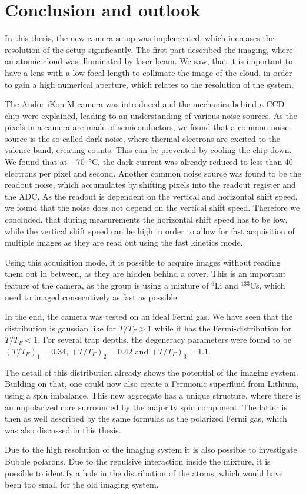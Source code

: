 \chapter{Conclusion and outlook}

In this thesis, the new camera setup was implemented, which increases the resolution of the setup significantly. The first part described the imaging, where an atomic cloud was illuminated by laser beam. We saw, that it is important to have a lens with a low focal length to collimate the image of the cloud, in order to gain a high numerical aperture, which relates to the resolution of the system.

The Andor iKon M camera was introduced and the mechanics behind a CCD chip were explained, leading to an understanding of various noise sources. As the pixels in a camera are made of semiconductors, we found that a common noise source is the so-called dark noise, where thermal electrons are excited to the valence band, creating counts. This can be prevented by cooling the chip down. We found that at \SI{-70}{\degreeCelsius}, the dark current was already reduced to less than 40 electrons per pixel and second. Another common noise source was found to be the readout noise, which accumulates by shifting pixels into the readout register and the ADC.
As the readout is dependent on the vertical and horizontal shift speed, we found that the noise does not depend on the vertical shift speed. Therefore we concluded, that during measurements the horizontal shift speed has to be low, while the vertical shift speed can be high in order to allow for fast acquisition of multiple images as they are read out using the fast kinetics mode.

Using this acquisition mode, it is possible to acquire images without reading them out in between, as they are hidden behind a cover. This is an important feature of the camera, as the group is using a mixture of $^6$Li and $^{133}$Cs, which need to imaged consecutively as fast as possible.

In the end, the camera was tested on an ideal Fermi gas. We have seen that the distribution is gaussian like for $T/T_F > 1$ while it has the Fermi-distribution for $T/T_F < 1$. For several trap depths, the degeneracy parameters were found to be $(T/T_F)_1 = 0.34$, $(T/T_F)_2 = 0.42$ and $(T/T_F)_3 = 1.1$.

The detail of this distribution already shows the potential of the imaging system. Building on that, one could now also create a Fermionic superfluid from Lithium, using a spin imbalance. This new aggregate has a unique structure, where there is an unpolarized core surrounded by the majority spin component. The latter is then as well described by the same formulas as the polarized Fermi gas, which was also discussed in this thesis.

Due to the high resolution of the imaging system it is also possible to investigate Bubble polarons. Due to the repulsive interaction inside the mixture, it is possible to identify a hole in the distribution of the atoms, which would have been too small for the old imaging system.
